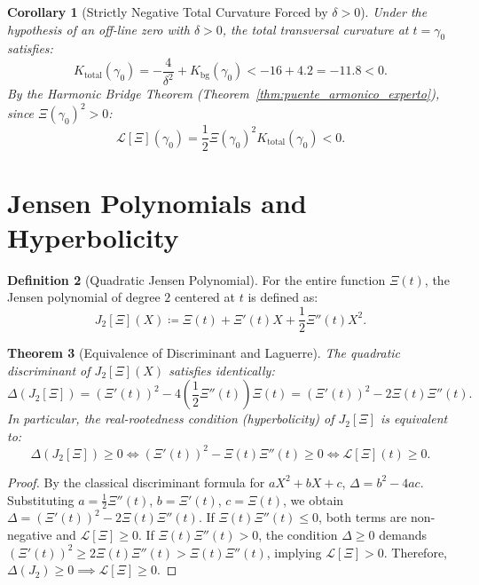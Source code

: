 \documentclass[11pt,a4paper]{article}
\newtheorem{theorem}{Theorem}[section]
\newtheorem{corollary}[theorem]{Corollary}
\theoremstyle{definition}
\newtheorem{definition}[theorem]{Definition}
\theoremstyle{remark}
\begin{document}
\begin{corollary}[Strictly Negative Total Curvature Forced by $\delta > 0$]
\label{cor:curvatura_negativa_forzada}
Under the hypothesis of an off-line zero with $\delta > 0$, the total transversal curvature at $t = \gamma_0$ satisfies:
\begin{equation}
K_{\mathrm{total}}(\gamma_0) = -\frac{4}{\delta^2} + K_{\mathrm{bg}}(\gamma_0) < -16 + 4.2 = -11.8 < 0.
\end{equation}
By the Harmonic Bridge Theorem (Theorem~\ref{thm:puente_armonico_experto}), since $\Xi(\gamma_0)^2 > 0$:
\begin{equation}
\label{eq:laguerre_negativo_obligatorio}
\mathcal{L}[\Xi](\gamma_0) = \frac{1}{2} \Xi(\gamma_0)^2 K_{\mathrm{total}}(\gamma_0) < 0.
\end{equation}
\end{corollary}

\section{Jensen Polynomials and Hyperbolicity}

\begin{definition}[Quadratic Jensen Polynomial]
For the entire function $\Xi(t)$, the Jensen polynomial of degree $2$ centered at $t$ is defined as:
\begin{equation}
J_2[\Xi](X) \coloneqq \Xi(t) + \Xi'(t) X + \frac{1}{2} \Xi''(t) X^2.
\end{equation}
\end{definition}

\begin{theorem}[Equivalence of Discriminant and Laguerre]
The quadratic discriminant of $J_2[\Xi](X)$ satisfies identically:
\begin{equation}
\Delta(J_2[\Xi]) = (\Xi'(t))^2 - 4\left(\frac{1}{2}\Xi''(t)\right)\Xi(t) = (\Xi'(t))^2 - 2 \Xi(t)\Xi''(t).
\end{equation}
In particular, the real-rootedness condition (hyperbolicity) of $J_2[\Xi]$ is equivalent to:
\begin{equation}
\Delta(J_2[\Xi]) \ge 0 \iff (\Xi'(t))^2 - \Xi(t)\Xi''(t) \ge 0 \iff \mathcal{L}[\Xi](t) \ge 0.
\end{equation}
\end{theorem}

\begin{proof}
By the classical discriminant formula for $a X^2 + b X + c$, $\Delta = b^2 - 4ac$. Substituting $a = \frac{1}{2}\Xi''(t)$, $b = \Xi'(t)$, $c = \Xi(t)$, we obtain $\Delta = (\Xi'(t))^2 - 2\Xi(t)\Xi''(t)$. If $\Xi(t)\Xi''(t) \le 0$, both terms are non-negative and $\mathcal{L}[\Xi] \ge 0$. If $\Xi(t)\Xi''(t) > 0$, the condition $\Delta \ge 0$ demands $(\Xi'(t))^2 \ge 2\Xi(t)\Xi''(t) > \Xi(t)\Xi''(t)$, implying $\mathcal{L}[\Xi] > 0$. Therefore, $\Delta(J_2) \ge 0 \implies \mathcal{L}[\Xi] \ge 0$.
\end{proof}
\end{document}
